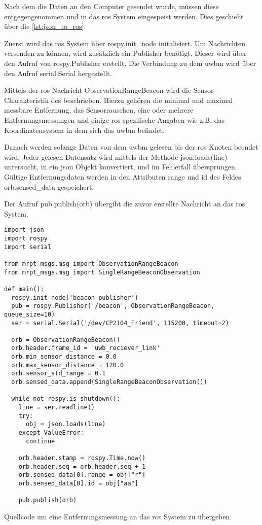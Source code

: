 Nach dem die Daten an den Computer gesendet wurde, müssen diese entgegengenommen und in das \Gls{ros} System eingespeist werden. Dies geschieht über die \autoref{lst:json_to_ros}.

Zuerst wird das \Gls{ros} System über rospy.init\_node initalisiert. Um Nachrichten versenden zu können, wird zusätzlich ein Publisher benötigt. Dieser wird über den Aufruf von rospy.Publisher erstellt. Die Verbindung zu dem \Gls{uwbm} wird über den Aufruf serial.Serial hergestellt.

Mittels der \Gls{ros} Nachricht ObservationRangeBeacon wird die Sensor-Charakteristik des  beschrieben. Hierzu gehören die minimal und maximal messbare Entfernung, das Sensorrauschen, eine oder mehrere Entfernungsmessungen und einige \Gls{ros} spezifische Angaben wie z.B. das Koordinatensystem in dem sich das \Gls{uwbm} befindet.

Danach werden solange Daten von dem \Gls{uwbm} gelesen bis der \Gls{ros} Knoten beendet wird. Jeder gelesen Datensatz wird mittels der Methode json.loads(line) untersucht, in ein \Gls{json} Objekt konvertiert, und im Fehlerfall übersprungen. Gültige Entfernungsdaten werden in den Attributen range und id des Feldes orb.sensed\_data gespeichert.

Der Aufruf pub.publish(orb) übergibt die zuvor erstellte Nachricht an das \Gls{ros} System.

\begin{listing}
	\begin{verbatim}
import json
import rospy
import serial

from mrpt_msgs.msg import ObservationRangeBeacon
from mrpt_msgs.msg import SingleRangeBeaconObservation

def main():
  rospy.init_node('beacon_publisher')
  pub = rospy.Publisher('/beacon', ObservationRangeBeacon, queue_size=10)
  ser = serial.Serial('/dev/CP2104_Friend', 115200, timeout=2)

  orb = ObservationRangeBeacon()
  orb.header.frame_id = 'uwb_reciever_link'
  orb.min_sensor_distance = 0.0
  orb.max_sensor_distance = 120.0
  orb.sensor_std_range = 0.1
  orb.sensed_data.append(SingleRangeBeaconObservation())

  while not rospy.is_shutdown():
    line = ser.readline()
    try:
      obj = json.loads(line)
    except ValueError:
      continue

    orb.header.stamp = rospy.Time.now()
    orb.header.seq = orb.header.seq + 1
    orb.sensed_data[0].range = obj["r"]
    orb.sensed_data[0].id = obj["aa"]

    pub.publish(orb)
	\end{verbatim}
	\unskip
	\caption{Quellcode um eine Entfernungsmessung an das \Gls{ros} System zu übergeben.}
	\label{lst:json_to_ros}
\end{listing}


